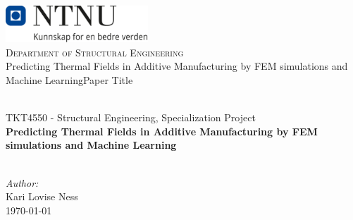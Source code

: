 


\def\TOPIC{TKT4550 - Structural Engineering, Specialization Project}

\def\TITLE{Predicting Thermal Fields in Additive
Manufacturing by FEM simulations and
Machine Learning}

\def\AUTHORS{
    Kari Lovise Ness \\

}



\begin{titlepage}

\vbox{ }

\vbox{ }

\begin{center}
\includegraphics[width=0.40\textwidth]{Images/NTNU_logo.png}\\[1cm]
\textsc{\LARGE Department of Structural Engineering}\\[1.0cm]


\def\checktitle{Paper Title}
\ifx\TITLE\checktitle
\fi

\vbox{ }
\HRule \\[0.4cm]
{ \large \TOPIC } \\[0.3cm]
{ \huge \bfseries \TITLE}\\[0.4cm]
\HRule \\[1.5cm]
\large


\emph{Author:}\\
\AUTHORS


\vfill
{\large \today}
\end{center}
\end{titlepage}








